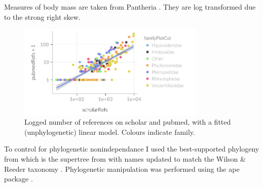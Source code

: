 Measures of body mass are taken from Pantheria \cite{jones2009pantheria}.
They are log transformed due to the strong right skew.


























\begin{knitrout}\footnotesize
{}\color{fgcolor}\begin{figure}[t]

{\centering \includegraphics[width=0.8\textwidth]{figure/scholarvspubmed-1} 

}

\caption[Logged number of references on scholar and pubmed, with a fitted (unphylogenetic) linear model]{Logged number of references on scholar and pubmed, with a fitted (unphylogenetic) linear model. Colours indicate family.}\label{fig:scholarvspubmed}
\end{figure}


\end{knitrout}








To control for phylogenetic nonindependance I used the best-supported phylogeny from \cite{fritz2009geographical} which is the supertree from \cite{bininda2007delayed} with names updated to match the Wilson \& Reeder taxonomy \cite{wilson2005mammal}.
Phylogenetic manipulation was performed using the ape package \cite{ape}.




